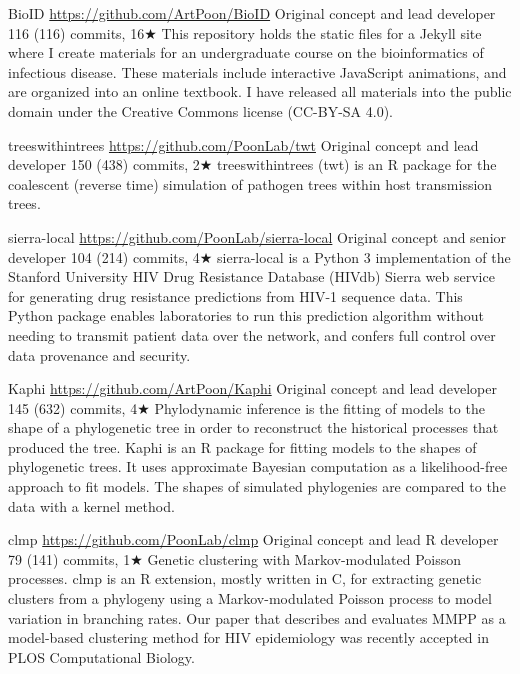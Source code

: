 {BioID}
{\url{https://github.com/ArtPoon/BioID}}
{Original concept and lead developer}
{116 (116) commits, 16$\bigstar$}
{This repository holds the static files for a Jekyll site where I create materials for an undergraduate course on the bioinformatics of infectious disease.  These materials include interactive JavaScript animations, and are organized into an online textbook.  I have released all materials into the public domain under the Creative Commons license (CC-BY-SA 4.0).}



{treeswithintrees}
{\url{https://github.com/PoonLab/twt}}
{Original concept and lead developer}
{150 (438) commits, 2$\bigstar$}
{treeswithintrees (twt) is an R package for the coalescent (reverse time) simulation of pathogen trees within host transmission trees.}


{sierra-local}
{\url{https://github.com/PoonLab/sierra-local}}
{Original concept and senior developer}
{104 (214) commits, 4$\bigstar$}
{sierra-local is a Python 3 implementation of the Stanford University HIV Drug Resistance Database (HIVdb) Sierra web service for generating drug resistance predictions from HIV-1 sequence data. This Python package enables laboratories to run this prediction algorithm without needing to transmit patient data over the network, and confers full control over data provenance and security.}


{Kaphi}
{\url{https://github.com/ArtPoon/Kaphi}}
{Original concept and lead developer}
{145 (632) commits, 4$\bigstar$}
{Phylodynamic inference is the fitting of models to the shape of a phylogenetic tree in order to reconstruct the historical processes that produced the tree.
Kaphi is an R package for fitting models to the shapes of phylogenetic trees.
It uses approximate Bayesian computation as a likelihood-free approach to fit models.
The shapes of simulated phylogenies are compared to the data with a kernel method.}



{clmp}
{\url{https://github.com/PoonLab/clmp}}
{Original concept and lead R developer}
{79 (141) commits, 1$\bigstar$}
{Genetic clustering with Markov-modulated Poisson processes. 
clmp is an R extension, mostly written in C, for extracting genetic clusters from a phylogeny using a Markov-modulated Poisson process to model variation in branching rates. Our paper that describes and evaluates MMPP as a model-based clustering method for HIV epidemiology was recently accepted in PLOS Computational Biology.
}


